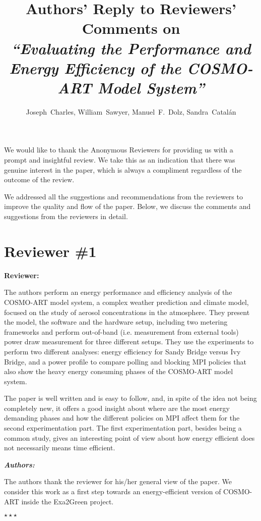 \documentclass[a4paper,11pt]{article}
\title{Authors' Reply to Reviewers' Comments on\\ \itshape{``Evaluating the Performance and Energy Efficiency of the COSMO-ART Model System''}}
\author{Joseph~Charles, William~Sawyer, Manuel~F.~Dolz, Sandra~Catal\'an}
\newcounter{question}
\newcommand{\reviewerSay}{\vspace{0.2cm} {\bf \noindent } {\bf Reviewer:} \medskip \par}
\newcommand{\weReply}{\vspace{0.25cm} {\bf \noindent } \addtocounter{question}{1} \textbf{\emph{Authors:}} \medskip \em\par}
\newenvironment{weSay}{\bigskip \weReply \begin{it}}{\end{it}\begin{center} \samepage$\star \star \star$ \end{center}}
\begin{document}
\maketitle

\noindent 
We would like to thank the Anonymous Reviewers
for providing us with a prompt and insightful review. 
We take this as an indication that there was genuine interest in the paper,
which is always a compliment regardless of the outcome of the review.

We addressed all the suggestions and recommendations from the reviewers to improve
the quality and flow of the paper. Below, we discuss the comments and suggestions
from the reviewers in detail.



\section*{Reviewer \#1}

\reviewerSay
The authors perform an energy performance and efficiency analysis of the COSMO-ART model system,
a complex weather prediction and climate model, focused on the study of aerosol concentrations in the
atmosphere. They present the model, the software and the hardware setup, including two metering
frameworks and perform out-of-band (i.e. measurement from external tools) power draw measurement
for three different setups. They use the experiments to perform two different analyses: energy 
efficiency for Sandy Bridge versus Ivy Bridge, and a power profile to compare polling and blocking 
MPI policies that also show the heavy energy consuming phases of the COSMO-ART model system.

The paper is well written and is easy to follow, and, in spite of the idea not being completely new, 
it offers a good insight about where are the most energy demanding phases and how the different 
policies on MPI affect them for the second experimentation part. The first experimentation part, 
besides being a common study, gives an interesting point of view about how energy efficient does 
not necessarily means time efficient.

\begin{weSay}
The authors thank the reviewer for his/her general view of the paper. We consider this work as
a first step towards an energy-efficient version of COSMO-ART inside the Exa2Green project.
\end{weSay}
\end{document}

